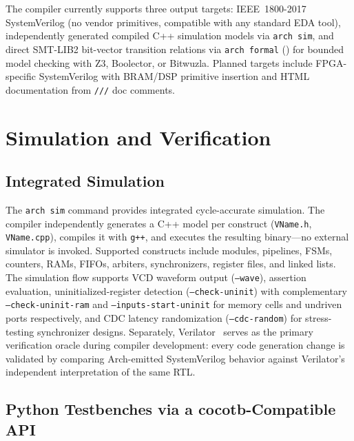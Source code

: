 \documentclass[11pt,twocolumn]{article}
\begin{document}
The compiler currently supports three output targets:
IEEE~1800-2017 SystemVerilog (no vendor primitives, compatible with any standard EDA tool),
independently generated compiled C++ simulation models via \texttt{arch sim},
and direct SMT-LIB2 bit-vector transition relations via \texttt{arch formal} () for bounded model checking with Z3, Boolector, or Bitwuzla.
Planned targets include FPGA-specific SystemVerilog with BRAM/DSP primitive insertion and HTML documentation from \texttt{///} doc comments.

\section{Simulation and Verification}\label{sec:sim}

\subsection{Integrated Simulation}

The \texttt{arch sim} command provides integrated cycle-accurate simulation. The compiler independently generates a C++ model per construct (\texttt{VName.h}, \texttt{VName.cpp}), compiles it with \texttt{g++}, and executes the resulting binary---no external simulator is invoked. Supported constructs include modules, pipelines, FSMs, counters, RAMs, FIFOs, arbiters, synchronizers, register files, and linked lists. The simulation flow supports VCD waveform output (\texttt{--wave}), assertion evaluation, uninitialized-register detection (\texttt{--check-uninit}) with complementary \texttt{--check-uninit-ram} and \texttt{--inputs-start-uninit} for memory cells and undriven ports respectively, and CDC latency randomization (\texttt{--cdc-random}) for stress-testing synchronizer designs. Separately, Verilator~\cite{verilator} serves as the primary verification oracle during compiler development: every code generation change is validated by comparing Arch-emitted SystemVerilog behavior against Verilator's independent interpretation of the same RTL.

\subsection{Python Testbenches via a cocotb-Compatible API}\label{sec:cocotb}
\end{document}
